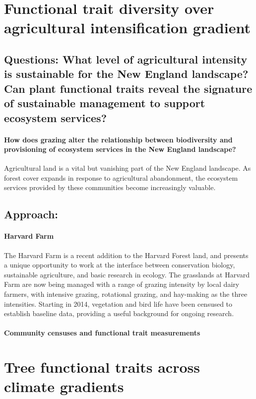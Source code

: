 \documentclass[11pt]{article}
\begin{document}
\section{Functional trait diversity over agricultural intensification gradient}

\subsection{Questions: What level of agricultural intensity is sustainable for the New England landscape? Can plant functional traits reveal the signature of sustainable management to support ecosystem services?}

\paragraph{How does grazing alter the relationship between biodiversity and provisioning of ecosystem services in the New England landscape?} Agricultural land is a vital but vanishing part of the New England landscape. As forest cover expands in response to agricultural abandonment, the ecosystem services provided by these communities become increasingly valuable.

\subsection{Approach:}

\paragraph{Harvard Farm} The Harvard Farm is a recent addition to the Harvard Forest land, and presents a unique opportunity to work at the interface between conservation biology, sustainable agriculture, and basic research in ecology. The grasslands at Harvard Farm are now being managed with a range of grazing intensity by local dairy farmers, with intensive grazing, rotational grazing, and hay-making as the three intensities. Starting in 2014, vegetation and bird life have been censused to establish baseline data, providing a useful background for ongoing research.

\paragraph{Community censuses and functional trait measurements} 

\section{Tree functional traits across climate gradients}
\end{document}
